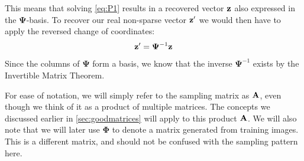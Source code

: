 This means that solving \eqref{eq:P1} results in a recovered vector $ \mathbf{z} $ also expressed in the $ \mathbf{\Psi} $-basis. To recover our real non-sparse vector $ \mathbf{z}' $ we would then have to apply the reversed change of coordinates:
\[
	\mathbf{z}' = \mathbf{\Psi}^{-1}\mathbf{z} 
\]
Since the columns of $ \mathbf{\Psi} $ form a basis, we know that the inverse $ \mathbf{\Psi}^{-1} $ exists by the Invertible Matrix Theorem.


For ease of notation, we will simply refer to the sampling matrix as $ \mathbf{A} $, even though we think of it as a product of multiple matrices. The concepts we discussed earlier in \cref{sec:goodmatrices} will apply to this product $ \mathbf{A} $. We will also note that we will later use $ \mathbf{\Phi} $ to denote a matrix generated from training images. This is a different matrix, and should not be confused with the sampling pattern here. 





